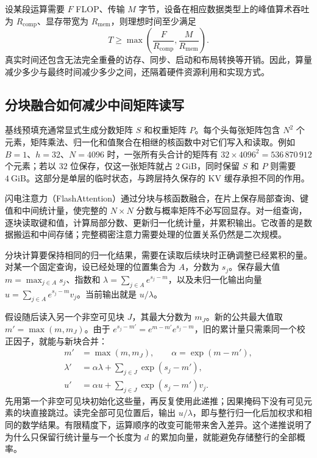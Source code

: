 设某段运算需要 $F$ FLOP、传输 $M$ 字节，设备在相应数据类型上的峰值算术吞吐为 $R_{\mathrm{comp}}$、显存带宽为 $R_{\mathrm{mem}}$，则理想时间至少满足
\begin{equation}
  T\geq\max\!\left(\frac{F}{R_{\mathrm{comp}}},
                   \frac{M}{R_{\mathrm{mem}}}\right).
  \label{l12:eq:resource-bound}
\end{equation}
真实时间还包含无法完全重叠的访存、同步、启动和布局转换等开销。因此，算量减少多少与最终时间减少多少之间，还隔着硬件资源利用和实现方式。

\subsection{分块融合如何减少中间矩阵读写}

基线预填充通常显式生成分数矩阵 $S$ 和权重矩阵 $P$。每个头每张矩阵包含 $N^2$ 个元素，矩阵乘法、归一化和值聚合在相继的核函数中对它们写入和读取。例如 $B=1$、$h=32$、$N=4096$ 时，一张所有头合计的矩阵有 $32\times4096^2=536\,870\,912$ 个元素；若以 $32$ 位保存，仅这一张矩阵就占 $2\ \mathrm{GiB}$，同时保留 $S$ 和 $P$ 则需要 $4\ \mathrm{GiB}$。这部分是单层的临时状态，与跨层持久保存的 KV 缓存承担不同的作用。

闪电注意力（FlashAttention）通过分块与核函数融合，在片上保存局部查询、键值和中间统计量，使完整的 $N\times N$ 分数与概率矩阵不必写回显存。对一组查询，逐块读取键和值，计算局部分数、更新归一化统计量，并累积输出。它改善的是数据搬运和中间存储；完整稠密注意力需要处理的位置关系仍然是二次规模。

分块计算要保持相同的归一化结果，需要在读取后续块时正确调整已经累积的量。对某一个固定查询，设已经处理的位置集合为 $A$，分数为 $s_j$。保存最大值 $m=\max_{j\in A}s_j$、指数和 $\lambda=\sum_{j\in A}e^{s_j-m}$，以及未归一化输出向量 $u=\sum_{j\in A}e^{s_j-m}v_j$。当前输出就是 $u/\lambda$。

假设随后读入另一个非空可见块 $J$，其最大分数为 $m_J$。新的公共最大值取 $m'=\max(m,m_J)$。由于 $e^{s_j-m'}=e^{m-m'}e^{s_j-m}$，旧的累计量只需乘同一个校正因子，就能与新块合并：
\begin{equation}
\begin{aligned}
 m'&=\max(m,m_J),\qquad \alpha=\exp(m-m'),\\
 \lambda'&=\alpha\lambda+\sum_{j\in J}\exp(s_j-m'),\\
 u'&=\alpha u+\sum_{j\in J}\exp(s_j-m')v_j.
\end{aligned}
\label{l12:eq:online-softmax}
\end{equation}
先用第一个非空可见块初始化这些量，再反复使用此递推；因果掩码下没有可见元素的块直接跳过。读完全部可见位置后，输出 $u/\lambda$，即与整行归一化后加权求和相同的数学结果。有限精度下，运算顺序的改变可能带来舍入差异。这个递推说明了为什么只保留行统计量与一个长度为 $d$ 的累加向量，就能避免存储整行的全部概率。

